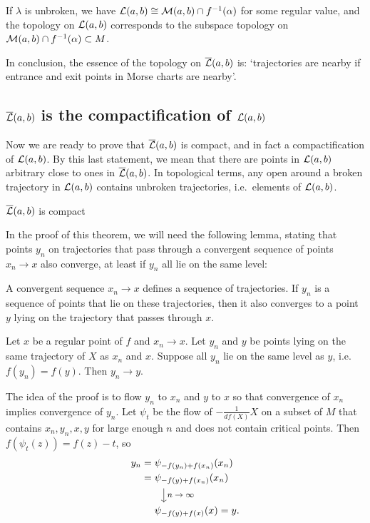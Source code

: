 \begin{remark}
    If $\lambda$ is unbroken, we have $\mathcal L(a, b) \cong \mathcal M(a, b) \cap  f^{-1}(\alpha)$ for some regular value, and the topology on $\mathcal L(a, b)$ corresponds to the subspace topology on $\mathcal M(a, b) \cap  f^{-1}(\alpha) \subset M$.
\end{remark}

In conclusion, the essence of the topology on $\overline{\mathcal L}(a, b)$ is: `trajectories are nearby if entrance and exit points in Morse charts are nearby'.

\subsection{$\overline{\mathcal L}(a, b)$ is the compactification of $\mathcal L(a, b)$}
Now we are ready to prove that $\overline{\mathcal L}(a, b)$ is compact, and in fact a compactification of  $\mathcal L(a, b)$. By this last statement, we mean that there are points in $\mathcal L(a, b)$ arbitrary close to ones in  $\overline{\mathcal L}(a, b)$.
In topological terms, any open around a broken trajectory in $\mathcal L(a, b)$ contains unbroken trajectories, i.e.\ elements of $\mathcal L(a, b)$.
\begin{theorem}
    $\overline{\mathcal L}(a, b)$ is compact
\end{theorem}

In the proof of this theorem, we will need the following lemma, stating that points $y_n$ on trajectories that pass through a convergent sequence of points $x_n \to x$ also converge, at least if $y_n$ all lie on the same level:
\begin{marginfigure}
    \centering
    \caption{A convergent sequence $x_n \to  x$ defines a sequence of trajectories. If $y_n$ is a sequence of points that lie on these trajectories, then it also converges to a point $y$ lying on the trajectory that passes through $x$.}
    \label{fig:lemma-partial-squared-zero-proof}
\end{marginfigure}
\begin{lemma}
    Let $x$ be a regular point of $f$ and $x_n \to x$.
    Let $y_n$ and  $y$ be points lying on the same trajectory of $X$ as  $x_n$ and  $x$.
    Suppose all $y_n$ lie on the same level as  $y$, i.e.  $f(y_n) = f(y)$.
    Then  $y_n \to  y$.
    \label{lemma:level-sets}
\end{lemma}
\begin{myproof}
    The idea of the proof is to flow $y_n$ to  $x_n$ and $y$ to $x$ so that convergence of $x_n$ implies convergence of $y_n$.
    Let  $\psi_t$ be the flow of  $-\frac{1}{df (X)} X$ on a subset of $M$ that contains $x_n, y_n, x, y$ for large enough  $n$ and does not contain critical points.
    Then $f(\psi_t(z)) = f(z) - t$, so
     \begin{align*}
         y_n &= \psi_{-f(y_n) + f(x_n)}(x_n)\\
         &= \psi_{-f(y) + f(x_n)}(x_n)\\
         & \qquad \tikz \draw[->]  (0,0) -- (0,-0.5) node[midway, right]{\footnotesize$n \to  \infty$};\\[-0.4em]
         &\mbox{}\phantom{{}={}}\psi_{-f(y) + f(x)}(x) = y
    .\end{align*} 
\end{myproof}


